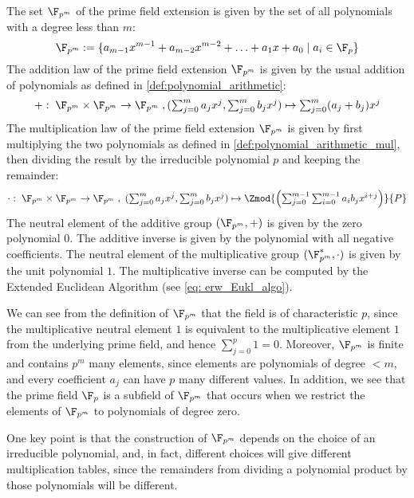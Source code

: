 The set $\F_{p^m}$ of the prime field extension is given by the set of all polynomials with a degree less than $m$:
\begin{equation}
\label{eq:prime-extension-field}
\F_{p^m}:= \{a_{m-1} x^{m-1}+a_{m-2}x^{m-2}+\ldots+a_1 x+a_0\;|\; a_i\in \F_p\}
\end{equation}
The addition law of the prime field extension $\F_{p^m}$ is given by the usual addition of polynomials as defined in \eqref{def:polynomial_arithmetic}: 
\begin{equation}
+:\; \F_{p^m}\times \F_{p^m} \to \F_{p^m}\; , \textstyle (\sum_{j=0}^m a_j x^j,\sum_{j=0}^m b_j x^j)\mapsto \sum_{j=0}^m (a_j+b_j) x^j
\end{equation}
The multiplication law of the prime field extension $\F_{p^m}$ is given by first multiplying the two polynomials as defined in \eqref{def:polynomial_arithmetic_mul},  then dividing the result by the irreducible polynomial $p$ and keeping the remainder:
\begin{equation}
\cdot : \; \F_{p^m}\times \F_{p^m} \to \F_{p^m}\; , \textstyle\; (\sum_{j=0}^m a_j x^j,\sum_{j=0}^m b_j x^j)\mapsto \Zmod{\left(\sum _{j = 0} ^{m-1} \sum _{i = 0} ^{m-1}{a} _{i }{{b} _{j}}{x} ^{i+j}\right)}{P}
\end{equation}
The neutral element of the additive group $(\F_{p^m},+)$ is given by the zero polynomial $0$. The additive inverse is given by the polynomial with all negative coefficients. The neutral element of the multiplicative group $(\F^*_{p^m},\cdot)$ is given by the unit polynomial $1$. The multiplicative inverse can be computed by the Extended Euclidean Algorithm (see \ref{eq: erw_Eukl_algo}).

We can see from the definition of $\F_{p^m}$ that the field is of characteristic $p$, since the multiplicative neutral element $1$ is equivalent to the multiplicative element $1$ from the underlying prime field, and hence $\sum_{j=0}^p 1=0$. Moreover, $\F_{p^m}$ is finite and contains $p^m$ many elements, since elements are polynomials of degree $<m$, and every coefficient $a_j$ can have $p$ many different values. In addition, we see that the prime field $\F_p$ is a subfield of $\F_{p^m}$ that occurs when we restrict the elements of $\F_{p^m}$ to polynomials of degree zero.

One key point is that the construction of $\F_{p^m}$ depends on the choice of an irreducible polynomial, and, in fact, different choices will give different multiplication tables, since the remainders from dividing a polynomial product by those polynomials will be different.

